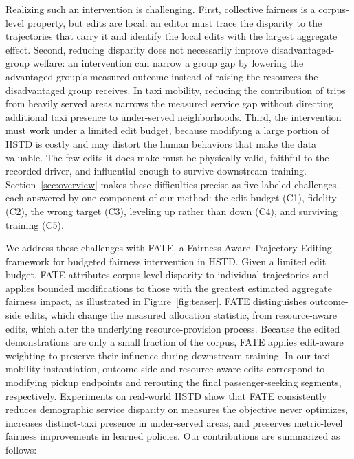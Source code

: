 Realizing such an intervention is challenging. First, collective fairness is a
corpus-level property, but edits are local: an editor must trace the disparity
to the trajectories that carry it and identify the local edits with the largest
aggregate effect. Second, reducing disparity does not necessarily improve
disadvantaged-group welfare: an intervention can narrow a group gap by lowering
the advantaged group's measured outcome instead of raising the resources the
disadvantaged group receives. In taxi mobility, reducing the contribution of
trips from heavily served areas narrows the measured service gap without
directing additional taxi presence to under-served neighborhoods. Third, the
intervention must work under a limited edit budget, because modifying a large
portion of HSTD is costly and may distort the human behaviors that make the
data valuable. The few edits it does make must be physically valid, faithful to
the recorded driver, and influential enough to survive downstream training.
Section~\ref{sec:overview} makes these difficulties precise as five labeled
challenges, each answered by one component of our method: the edit budget
(C1), fidelity (C2), the wrong target (C3), leveling up rather than down
(C4), and surviving training (C5).

We address these challenges with FATE, a Fairness-Aware Trajectory
Editing framework for budgeted fairness intervention in HSTD. Given a limited
edit budget, FATE attributes corpus-level disparity to individual trajectories
and applies bounded modifications to those with the greatest estimated
aggregate fairness impact, as illustrated in Figure~\ref{fig:teaser}. FATE
distinguishes outcome-side edits, which change the measured allocation
statistic, from resource-aware edits, which alter the underlying
resource-provision process. Because the edited demonstrations are only a small
fraction of the corpus, FATE applies edit-aware weighting to preserve their
influence during downstream training. In our taxi-mobility instantiation,
outcome-side and resource-aware edits correspond to
modifying pickup endpoints and rerouting the final passenger-seeking segments,
respectively. Experiments on real-world HSTD show that FATE consistently
reduces demographic service disparity on measures the objective never
optimizes, increases distinct-taxi presence in
under-served areas, and preserves metric-level fairness improvements in
learned policies. Our contributions are summarized as follows:

